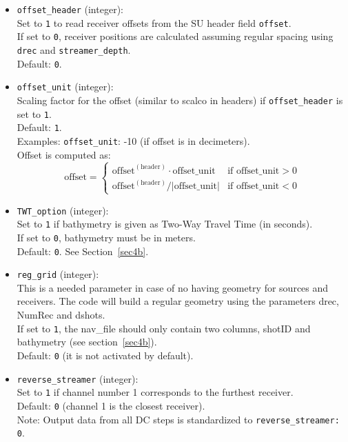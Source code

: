 \documentclass[11pt, oneside]{article}   	%
\begin{document}
\begin{itemize}
\item \texttt{offset\_header} (integer):\\
Set to \texttt{1} to read receiver offsets from the SU header field \texttt{offset}.\\
If set to \texttt{0}, receiver positions are calculated assuming regular spacing using \texttt{drec} and \texttt{streamer\_depth}.\\
Default: \texttt{0}.

\item \texttt{offset\_unit} (integer):\\
Scaling factor for the offset (similar to scalco in headers) if \texttt{offset\_header} is set to \texttt{1}.\\
Default: \texttt{1}.\\
Examples: \texttt{offset\_unit}: -10 (if offset is in decimeters). \\
Offset is computed as:
\[
\text{offset} =
\begin{cases}
\text{offset}^{(\text{header})} \cdot \text{offset\_unit} & \text{if } \text{offset\_unit} > 0 \\
\text{offset}^{(\text{header})} / |\text{offset\_unit}| & \text{if } \text{offset\_unit} < 0
\end{cases}
\]

\item \texttt{TWT\_option} (integer):\\
Set to \texttt{1} if bathymetry is given as Two-Way Travel Time (in seconds).\\
If set to \texttt{0}, bathymetry must be in meters.\\
Default: \texttt{0}. See Section~\ref{sec4b}.

\item \texttt{reg\_grid} (integer):\\
This is a needed parameter in case of no having geometry for sources and receivers. The code will build a regular geometry using the parameters drec, NumRec and dshots. \\
If set to \texttt{1}, the nav\_file should only contain two columns, shotID and bathymetry (see section~\ref{sec4b}).\\
Default: \texttt{0} (it is not activated by default).

\item \texttt{reverse\_streamer} (integer):\\
Set to \texttt{1} if channel number 1 corresponds to the furthest receiver.\\
Default: \texttt{0} (channel 1 is the closest receiver).\\
Note: Output data from all DC steps is standardized to \texttt{reverse\_streamer: 0}.


\end{itemize}
\end{document}
